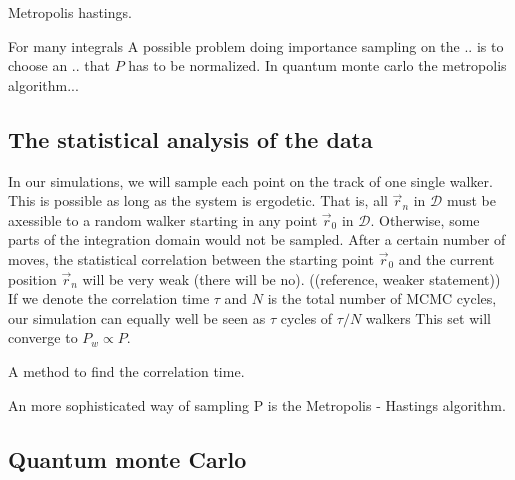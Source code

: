 \documentclass[a4paper,10pt,twocolumn]{article} %
\begin{document}
Metropolis hastings.


For many integrals
A possible problem doing importance sampling on the .. is to choose an .. that $P$ has to be normalized. In quantum monte carlo
the metropolis algorithm...

\subsection{The statistical analysis of the data}%

In our simulations, we will sample each point on the track of one single walker. 
This is possible as long as the system is ergodetic. That is, all $\vec r_n$ in $\mathcal D$ must be axessible to a 
random walker starting in any point $\vec r_0$ in $\mathcal D$. 
Otherwise, some parts of the integration domain would not be sampled.
After a certain number of moves, the statistical correlation between
the starting point $\vec r_0$ and the current position $\vec r_n$ will be very weak (there will be no). 
((reference, weaker statement))
If we denote the correlation time $\tau$ and $N$ is the total number of MCMC cycles, 
our simulation can equally well be seen as $\tau$ cycles of $\tau/N$ walkers
This set will converge to $P_w \propto P$.

A method to find the correlation time.


An more sophisticated way of sampling P is the Metropolis - Hastings algorithm.

\subsection{Quantum monte Carlo}%
\end{document}
